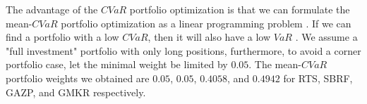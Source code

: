 \documentclass{llncs}
\begin{document}


The advantage of the $CVaR$ portfolio optimization is that we can formulate the mean-$CVaR$ portfolio optimization as a linear programming problem \cite{Rock2000}. %
If we can find a portfolio with a low $CVaR$, then it will also have a low $VaR$ \cite{wnc04}.
%
%
%
We assume a "full investment" portfolio with only long positions, furthermore, to avoid a corner portfolio case, let the minimal weight be limited by $0.05$. The mean-$CVaR$ portfolio weights we obtained are $0.05$, $0.05$, $0.4058$, and $0.4942$ for 
RTS, SBRF,  GAZP, and GMKR respectively.

\end{document}
